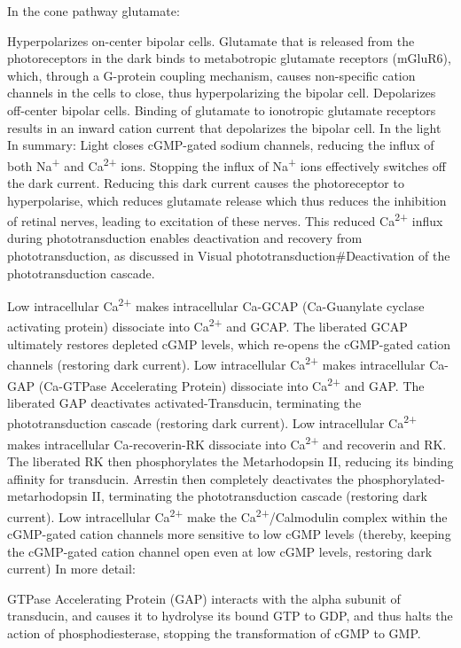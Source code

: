 In the cone pathway glutamate:

Hyperpolarizes on-center bipolar cells. Glutamate that is released from the photoreceptors in the dark binds to metabotropic glutamate receptors (mGluR6), which, through a G-protein coupling mechanism, causes non-specific cation channels in the cells to close, thus hyperpolarizing the bipolar cell.
Depolarizes off-center bipolar cells. Binding of glutamate to ionotropic glutamate receptors results in an inward cation current that depolarizes the bipolar cell.
In the light
In summary: Light closes cGMP-gated sodium channels, reducing the influx of both Na\textsuperscript{+} and Ca\textsuperscript{2+} ions. Stopping the influx of Na\textsuperscript{+} ions effectively switches off the dark current. Reducing this dark current causes the photoreceptor to hyperpolarise, which reduces glutamate release which thus reduces the inhibition of retinal nerves, leading to excitation of these nerves. This reduced Ca\textsuperscript{2+} influx during phototransduction enables deactivation and recovery from phototransduction, as discussed in Visual phototransduction\#Deactivation of the phototransduction cascade.

Low intracellular Ca\textsuperscript{2+} makes intracellular Ca-GCAP (Ca-Guanylate cyclase activating protein) dissociate into Ca\textsuperscript{2+} and GCAP. The liberated GCAP ultimately restores depleted cGMP levels, which re-opens the cGMP-gated cation channels (restoring dark current).
Low intracellular Ca\textsuperscript{2+} makes intracellular Ca-GAP (Ca-GTPase Accelerating Protein) dissociate into Ca\textsuperscript{2+} and GAP. The liberated GAP deactivates activated-Transducin, terminating the phototransduction cascade (restoring dark current).
Low intracellular Ca\textsuperscript{2+} makes intracellular Ca-recoverin-RK dissociate into Ca\textsuperscript{2+} and recoverin and RK. The liberated RK then phosphorylates the Metarhodopsin II, reducing its binding affinity for transducin. Arrestin then completely deactivates the phosphorylated-metarhodopsin II, terminating the phototransduction cascade (restoring dark current).
Low intracellular Ca\textsuperscript{2+} make the Ca\textsuperscript{2+}/Calmodulin complex within the cGMP-gated cation channels more sensitive to low cGMP levels (thereby, keeping the cGMP-gated cation channel open even at low cGMP levels, restoring dark current)
In more detail:

GTPase Accelerating Protein (GAP) interacts with the alpha subunit of transducin, and causes it to hydrolyse its bound GTP to GDP, and thus halts the action of phosphodiesterase, stopping the transformation of cGMP to GMP.

